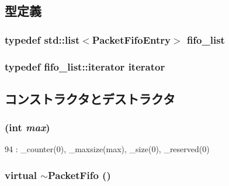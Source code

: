 \subsection{型定義}
\hypertarget{classPacketFifo_a8ef5de3fd8fcb3e4544652034a023572}{
\subsubsection[{fifo\_\-list}]{\setlength{\rightskip}{0pt plus 5cm}typedef {\bf std::list}$<${\bf PacketFifoEntry}$>$ {\bf fifo\_\-list}}}
\label{classPacketFifo_a8ef5de3fd8fcb3e4544652034a023572}
\hypertarget{classPacketFifo_a6905b6d8863a2eecd86b633802b68fda}{
\subsubsection[{iterator}]{\setlength{\rightskip}{0pt plus 5cm}typedef fifo\_\-list::iterator {\bf iterator}}}
\label{classPacketFifo_a6905b6d8863a2eecd86b633802b68fda}


\subsection{コンストラクタとデストラクタ}
\hypertarget{classPacketFifo_acc9c336039cbb7b6c68e558cebe2dc57}{
\subsubsection[{PacketFifo}]{ (int {\em max})}}
\label{classPacketFifo_acc9c336039cbb7b6c68e558cebe2dc57}



\begin{DoxyCode}
94         : _counter(0), _maxsize(max), _size(0), _reserved(0) {}
\end{DoxyCode}
\hypertarget{classPacketFifo_a8885fbad8b4450af73ebe2daf366dca6}{
\subsubsection[{$\sim$PacketFifo}]{\setlength{\rightskip}{0pt plus 5cm}virtual $\sim${\bf PacketFifo} ()}}
\label{classPacketFifo_a8885fbad8b4450af73ebe2daf366dca6}



